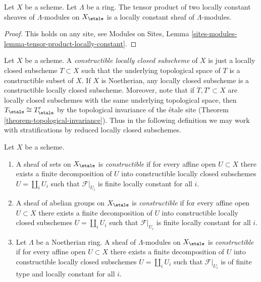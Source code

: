 \begin{lemma}
\label{lemma-tensor-product-locally-constant}
Let $X$ be a scheme. Let $\Lambda$ be a ring.
The tensor product of two locally constant sheaves of $\Lambda$-modules
on $X_\etale$ is a locally constant sheaf of $\Lambda$-modules.
\end{lemma}

\begin{proof}
This holds on any site, see
Modules on Sites, Lemma
\ref{sites-modules-lemma-tensor-product-locally-constant}.
\end{proof}

\noindent
Let $X$ be a scheme. A {\it constructible locally closed subscheme} of $X$
is just a locally closed subscheme $T \subset X$ such that the underlying
topological space of $T$ is a constructible subset of $X$. If $X$ is
Noetherian, any locally closed subscheme is a constructible locally
closed subscheme. Moreover, note that if $T, T' \subset X$ are locally
closed subschemes with the same underlying topological space, then
$T_\etale \cong T'_\etale$ by the topological
invariance of the \'etale site (Theorem \ref{theorem-topological-invariance}).
Thus in the following definition we may work with stratifications
by reduced locally closed subschemes.

\begin{definition}
\label{definition-constructible}
Let $X$ be a scheme.
\begin{enumerate}
\item A sheaf of sets on $X_\etale$ is {\it constructible}
if for every affine open $U \subset X$ there exists a finite decomposition
of $U$ into constructible locally closed subschemes $U = \coprod_i U_i$
such that $\mathcal{F}|_{U_i}$ is finite locally constant for all $i$.
\item A sheaf of abelian groups on $X_\etale$ is {\it constructible}
if for every affine open $U \subset X$ there exists a finite decomposition
of $U$ into constructible locally closed subschemes $U = \coprod_i U_i$
such that $\mathcal{F}|_{U_i}$ is finite locally constant for all $i$.
\item Let $\Lambda$ be a Noetherian ring. A sheaf of $\Lambda$-modules
on $X_\etale$ is {\it constructible} if for every affine open
$U \subset X$ there exists a finite decomposition
of $U$ into constructible locally closed subschemes
$U = \coprod_i U_i$ such that
$\mathcal{F}|_{U_i}$ is of finite type and locally constant for all $i$.
\end{enumerate}
\end{definition}


